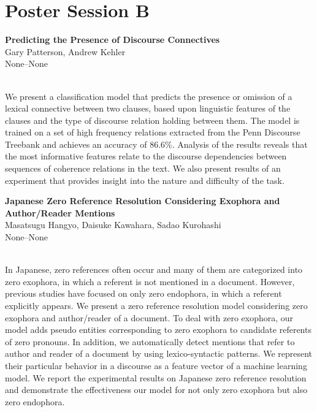 \documentclass[twoside,makeidx]{book}
\renewcommand{\normalsize}{\fontsize{8}{9}\selectfont}
\renewcommand{\small}{\fontsize{7}{8}\selectfont}
\begin{document}
\section{Poster Session B}
\vspace{-1em}
\par\vspace{2em}\noindent%
\begin{minipage}{\linewidth}%
\begin{center}
\textbf{\normalsize Predicting the Presence of Discourse Connectives}\\
\normalsize  Gary Patterson,  Andrew Kehler\\
{\small None--None}\\
\end{center}
\end{minipage}\\[0.5em]
\nopagebreak%
\noindent%
{\small We present a classification model that predicts the presence or omission of a lexical connective between two clauses, based upon linguistic features of the clauses and the type of discourse relation holding between them. The model is trained on a set of high frequency relations extracted from the Penn Discourse Treebank and achieves an accuracy of 86.6\%. Analysis of the results reveals that the most informative features relate to the discourse dependencies between sequences of coherence relations in the text. We also present results of an experiment that provides insight into the nature and difficulty of the task.}
\par\vspace{2em}\noindent%
\begin{minipage}{\linewidth}%
\begin{center}
\textbf{\normalsize Japanese Zero Reference Resolution Considering Exophora and Author/Reader Mentions}\\
\normalsize  Masatsugu Hangyo,  Daisuke Kawahara,  Sadao Kurohashi\\
{\small None--None}\\
\end{center}
\end{minipage}\\[0.5em]
\nopagebreak%
\noindent%
{\small In Japanese, zero references often occur and many of them are  categorized into zero exophora, in which a referent is not mentioned in a document. However, previous studies have focused on only zero endophora, in which a referent explicitly appears. We present a zero reference resolution model considering zero exophora and author/reader of a document. To deal with zero exophora, our model adds pseudo entities corresponding to zero exophora to candidate referents of zero pronouns. In addition, we automatically detect mentions that refer to author and reader of a document by using lexico-syntactic patterns. We represent their particular behavior in a discourse as a feature vector of a machine learning model. We report the experimental results on Japanese zero reference resolution and demonstrate the effectiveness our model for not only zero exophora but also zero endophora.}
\end{document}
